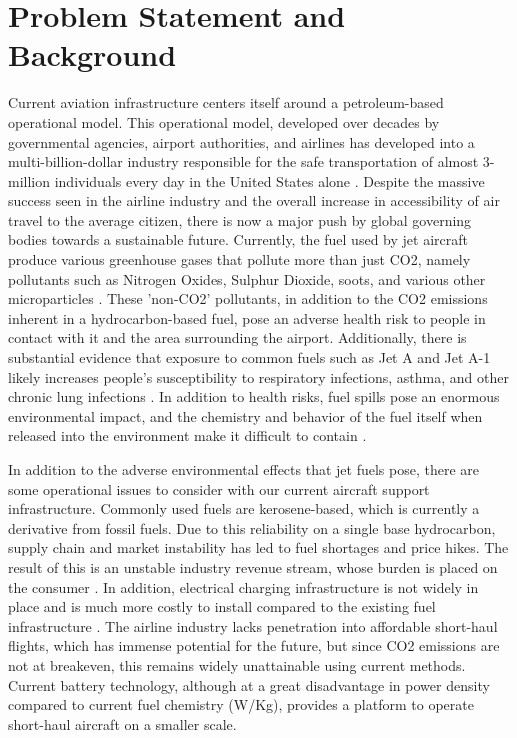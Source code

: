 \documentclass[../main.tex]{subfiles}
\begin{document}
\section{Problem Statement and Background}\label{probStatement}

Current aviation infrastructure centers itself around a petroleum-based operational model. This operational model, developed over decades by governmental agencies, airport authorities, and airlines has developed into a multi-billion-dollar industry responsible for the safe transportation of almost 3-million individuals every day in the United States alone \cite{ref19}. Despite the massive success seen in the airline industry and the overall increase in accessibility of air travel to the average citizen, there is now a major push by global governing bodies towards a sustainable future. Currently, the fuel used by jet aircraft produce various greenhouse gases that pollute more than just CO2, namely pollutants such as Nitrogen Oxides, Sulphur Dioxide, soots, and various other microparticles \cite{ref11}. These 'non-CO2' pollutants, in addition to the CO2 emissions inherent in a hydrocarbon-based fuel, pose an adverse health risk to people in contact with it and the area surrounding the airport. Additionally, there is substantial evidence that exposure to common fuels such as Jet A and Jet A-1 likely increases people's susceptibility to respiratory infections, asthma, and other chronic lung infections \cite{ref12}\cite{ref20}. In addition to health risks, fuel spills pose an enormous environmental impact, and the chemistry and behavior of the fuel itself when released into the environment make it difficult to contain \cite{ref14}\cite{ref15}.\par 
In addition to the adverse environmental effects that jet fuels pose, there are some operational issues to consider with our current aircraft support infrastructure. Commonly used fuels are kerosene-based, which is currently a derivative from fossil fuels. Due to this reliability on a single base hydrocarbon, supply chain and market instability has led to fuel shortages and price hikes. The result of this is an unstable industry revenue stream, whose burden is placed on the consumer \cite{ref13}. In addition, electrical charging infrastructure is not widely in place and is much more costly to install compared to the existing fuel infrastructure \cite{ref2}. The airline industry lacks penetration into affordable short-haul flights, which has immense potential for the future, but since CO2 emissions are not at breakeven, this remains widely unattainable using current methods. Current battery technology, although at a great disadvantage in power density compared to current fuel chemistry (W/Kg), provides a platform to operate short-haul aircraft on a smaller scale.\par 
\end{document}
